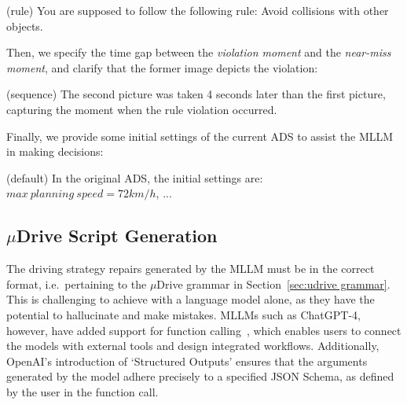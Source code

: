 \vspace{-0.15cm}\begin{promptbox}\small
\vspace{-0.15cm}
(rule) You are supposed to follow the following rule: Avoid collisions with other objects.
\vspace{-0.15cm}
\end{promptbox}\vspace{-0.15cm}
\vspace{-0.08cm}
Then, we specify the time gap between the \emph{violation moment} and the \emph{near-miss moment}, and clarify that the former image depicts the violation:
\vspace{-0.15cm}\begin{promptbox}\small
\vspace{-0.15cm}
(sequence) The second picture was taken 4 seconds later than the first picture, capturing the moment when the rule violation occurred.
\vspace{-0.15cm}
\end{promptbox}\vspace{-0.15cm}
Finally, we provide some initial settings of the current ADS to assist the MLLM in making decisions:
\vspace{-0.15cm}\begin{promptbox}\small
\vspace{-0.15cm}
(default) In the original ADS, the initial settings are: $max\ planning\ speed = 72 km/h$, ...
\vspace{-0.15cm}
\end{promptbox}\vspace{-0.15cm}







\subsection{$\mu$Drive Script Generation}
The driving strategy repairs generated by the MLLM must be in the correct format, i.e.~pertaining to the $\mu$Drive grammar in Section~\ref{sec:udrive grammar}.
This is challenging to achieve with a language model alone, as they have the potential to hallucinate and make mistakes.
MLLMs such as ChatGPT-4, however, have added support for function calling~\cite{gpt_function_calling}, which enables users to connect the models with external tools and design integrated workflows. Additionally, OpenAI's introduction of `Structured Outputs' ensures that the arguments generated by the model adhere precisely to a specified JSON Schema, as defined by the user in the function call.

